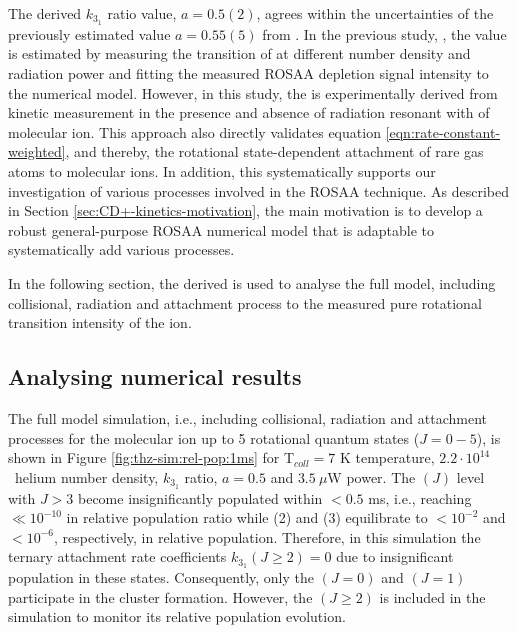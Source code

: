 The derived $k_{3_1}$ ratio value, $a=0.5(2)$, agrees within the uncertainties of the previously
estimated value $a=0.55(5)$ from \citet{Brunken2017}. In the previous study,
\cite{Brunken2017}, the  value is estimated by measuring the \CDline
transition of \CD at different number density and radiation power and fitting
the measured ROSAA depletion signal intensity to the numerical model. However,
in this study, the  is experimentally derived from kinetic measurement
in the presence and absence of radiation resonant with \CDline of \CD molecular
ion. This approach also directly validates equation
\ref{eqn:rate-constant-weighted}, and thereby, the rotational state-dependent
attachment of rare gas atoms to molecular ions. In addition, this
systematically supports our investigation of various processes involved in the
ROSAA technique. As described in Section \ref{sec:CD+-kinetics-motivation},
the main motivation is to develop a robust general-purpose ROSAA numerical
model that is adaptable to systematically add various processes.

In the following section, the derived  is used to analyse the full
model, including collisional, radiation and attachment process to the measured
pure rotational transition intensity of the \CD ion.

\subsection{Analysing numerical results}
\label{subsec:CD+-kinetics-simulation-analysis}

The full model simulation, i.e., including collisional, radiation and
attachment processes for the \CD molecular ion up to 5 rotational quantum states
($J=0-5$), is shown in Figure \ref{fig:thz-sim:rel-pop:1ms} for T$_{coll}=7$ K
temperature, $2.2 \cdot 10^{14}$ \percc\ helium number density, $k_{3_1}$
ratio, $a=0.5$ and $3.5\ \mu$W power.
The \CD$(J)$ level with $J>3$ become insignificantly populated within $<0.5$ ms, i.e.,
reaching $\ll 10^{-10}$ in relative population ratio while \CD(2) and \CD(3)
equilibrate to $<10^{-2}$ and $<10^{-6}$, respectively, in relative population. 
Therefore, in this simulation the ternary attachment rate coefficients $k_{3_1}(J\geq 2)=0$
due to insignificant population in these states. Consequently, only the
\CD$(J=0)$ and \CD$(J=1)$ participate in the cluster formation. However, the
\CD$(J \geq 2)$ is included in the simulation to monitor its relative
population evolution.

